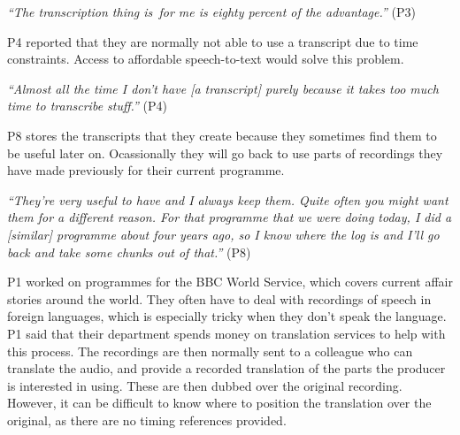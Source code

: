 \textit{``The transcription thing is for me is eighty percent of the advantage.''} (P3)

P4 reported that they are normally not able to use a transcript due to time constraints. Access to affordable
speech-to-text would solve this problem.

\textit{``Almost all the time I don't have [a transcript] purely because it takes too much time to transcribe stuff.''}
(P4)

P8 stores the transcripts that they create because they sometimes find them to be useful later on. Ocassionally they
will go back to use parts of recordings they have made previously for their current programme.

\textit{``They're very useful to have and I always keep them. Quite often you might want them for a different reason.
For that programme that we were doing today, I did a [similar] programme about four years ago, so I know where the log
is and I'll go back and take some chunks out of that.''} (P8)












P1 worked on programmes for the BBC World Service, which covers current affair stories around the world.  They often
have to deal with recordings of speech in foreign languages, which is especially tricky when they don't speak the
language. P1 said that their department spends money on translation services to help with this process. The recordings
are then normally sent to a colleague who can translate the audio, and provide a recorded translation of the parts the
producer is interested in using. These are then dubbed over the original recording. However, it can be difficult to
know where to position the translation over the original, as there are no timing references provided.

